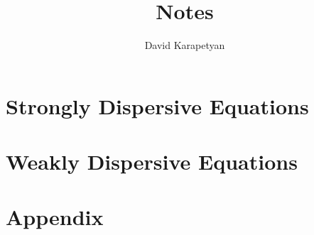 \documentclass[12pt,reqno]{amsbook}
\numberwithin{section}{chapter}
\numberwithin{equation}{section}  %
\theoremstyle{remark}
\begin{document}
\frontmatter
\title{Notes}
\author{David Karapetyan}

\date{}

\maketitle
\tableofcontents
\mainmatter
\part{Strongly Dispersive Equations}







\part{Weakly Dispersive Equations}

%
%
\part{Appendix}
%

%
\backmatter


%
\end{document}
